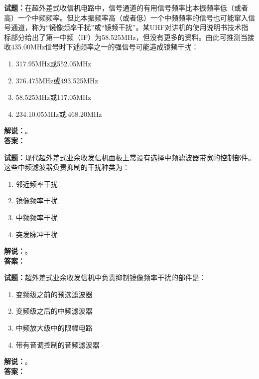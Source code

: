 \documentclass{ctexbook}
\begin{document}
\vspace{\baselineskip}

\noindent\textbf{试题：}在超外差式收信机电路中，信号通道的有用信号频率比本振频率低（或者高）一个中频频率。但比本振频率高（或者低）一个中频频率的信号也可能窜入信号通道，称为“镜像频率干扰”或“镜频干扰”。某UHF对讲机的使用说明书技术指标部分给出了第一中频（IF）为58.525\unit{\MHz}，但没有更多的资料。由此可推测当接收435.00\unit{\MHz}信号时下述频率之一的强信号可能造成镜频干扰：
\begin{enumerate}[leftmargin=3em]
  \item 317.95\unit{\MHz}或552.05\unit{\MHz}
  \item 376.475\unit{\MHz}或493.525\unit{\MHz}
  \item 58.525\unit{\MHz}或117.05\unit{\MHz}
  \item 234.10.05\unit{\MHz}或.468.20\unit{\MHz}
\end{enumerate}
\noindent\textbf{解说：}\textbf{}。\\\noindent\textbf{答案：}

\vspace{\baselineskip}

\noindent\textbf{试题：}现代超外差式业余收发信机面板上常设有选择中频滤波器带宽的控制部件。这些中频滤波器负责抑制的干扰种类为：
\begin{enumerate}[leftmargin=3em]
  \item 邻近频率干扰
  \item 镜像频率干扰
  \item 中频频率干扰
  \item 突发脉冲干扰
\end{enumerate}
\noindent\textbf{解说：}\textbf{}。\\\noindent\textbf{答案：}

\vspace{\baselineskip}

\noindent\textbf{试题：}超外差式业余收发信机中负责抑制镜像频率干扰的部件是：
\begin{enumerate}[leftmargin=3em]
  \item 变频级之前的预选滤波器
  \item 变频级之后的中频滤波器
  \item 中频放大级中的限幅电路
  \item 带有音调控制的音频滤波器
\end{enumerate}
\noindent\textbf{解说：}\textbf{}。\\\noindent\textbf{答案：}

\vspace{\baselineskip}
\end{document}
